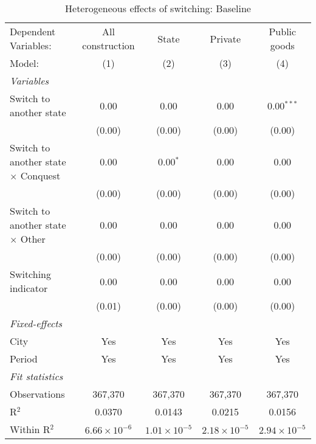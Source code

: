 \begin{table}[htbp]
   \caption{\label{tab:baseline_1y} Heterogeneous effects of switching: Baseline}
   \centering
   \begin{tabular}{lcccc}
      \tabularnewline \midrule \midrule
      Dependent Variables:                       & All construction      & State                 & Private               & Public goods\\  
      Model:                                     & (1)                   & (2)                   & (3)                   & (4)\\  
      \midrule
      \emph{Variables}\\
      Switch to another state                    & 0.00                  & 0.00                  & 0.00                  & 0.00$^{***}$\\   
                                                 & (0.00)                & (0.00)                & (0.00)                & (0.00)\\   
      Switch to another state $\times$ Conquest  & 0.00                  & 0.00$^{*}$            & 0.00                  & 0.00\\   
                                                 & (0.00)                & (0.00)                & (0.00)                & (0.00)\\   
      Switch to another state $\times$ Other     & 0.00                  & 0.00                  & 0.00                  & 0.00\\   
                                                 & (0.00)                & (0.00)                & (0.00)                & (0.00)\\   
      Switching indicator                        & 0.00                  & 0.00                  & 0.00                  & 0.00\\   
                                                 & (0.01)                & (0.00)                & (0.00)                & (0.00)\\   
      \midrule
      \emph{Fixed-effects}\\
      City                                       & Yes                   & Yes                   & Yes                   & Yes\\  
      Period                                     & Yes                   & Yes                   & Yes                   & Yes\\  
      \midrule
      \emph{Fit statistics}\\
      Observations                               & 367,370               & 367,370               & 367,370               & 367,370\\  
      R$^2$                                      & 0.0370                & 0.0143                & 0.0215                & 0.0156\\  
      Within R$^2$                               & $6.66\times 10^{-6}$  & $1.01\times 10^{-5}$  & $2.18\times 10^{-5}$  & $2.94\times 10^{-5}$\\   
      \midrule \midrule
      

\end{tabular}
\end{table}
